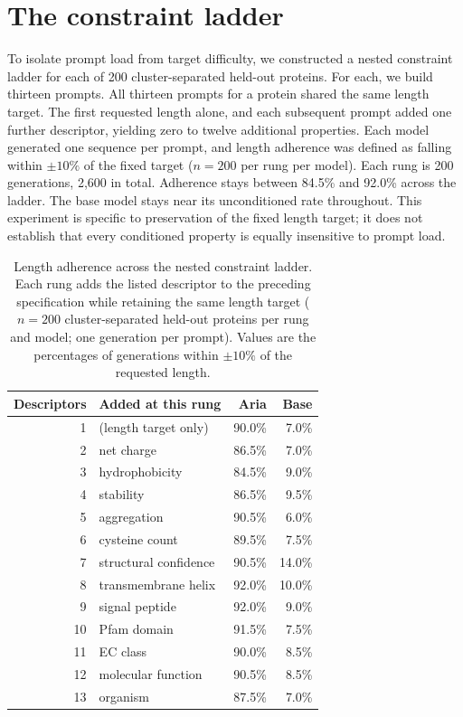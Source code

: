 \documentclass{article} %
\newcommand{\pct}{\%}
\begin{document}
\section{The constraint ladder}\label{app:ladder}
To isolate prompt load from target difficulty, we constructed a nested constraint ladder for each of 200 cluster-separated held-out proteins. For each, we build thirteen prompts. All thirteen prompts for a protein shared the same length target. The first requested length alone, and each subsequent prompt added one further descriptor, yielding zero to twelve additional properties. Each model generated one sequence per prompt, and length adherence was defined as falling within $\pm10\pct{}$ of the fixed target ($n=200$ per rung per model). Each
rung is 200 generations, 2{,}600 in total. Adherence stays between 84.5\pct{}
and 92.0\pct{} across the ladder. The base model stays
near its unconditioned rate throughout. This experiment is specific to preservation of the fixed length target; it does not establish that every conditioned property is equally insensitive to prompt load.
\begin{table}[h]
\caption{Length adherence across the nested constraint ladder. Each rung adds
the listed descriptor to the preceding specification while retaining the same
length target ($n=200$ cluster-separated held-out proteins per rung and model;
one generation per prompt). Values are the percentages of generations within
$\pm10\pct{}$ of the requested length.}
\label{tab:ladder}
\centering
\small
\begin{tabular}{rlrr}
\toprule
Descriptors & Added at this rung & Aria & Base \\
\midrule
1  & (length target only)  & 90.0\pct & 7.0\pct \\
2  & net charge            & 86.5\pct & 7.0\pct \\
3  & hydrophobicity        & 84.5\pct & 9.0\pct \\
4  & stability             & 86.5\pct & 9.5\pct \\
5  & aggregation           & 90.5\pct & 6.0\pct \\
6  & cysteine count        & 89.5\pct & 7.5\pct \\
7  & structural confidence & 90.5\pct & 14.0\pct \\
8  & transmembrane helix   & 92.0\pct & 10.0\pct \\
9  & signal peptide        & 92.0\pct & 9.0\pct \\
10 & Pfam domain           & 91.5\pct & 7.5\pct \\
11 & EC class              & 90.0\pct & 8.5\pct \\
12 & molecular function    & 90.5\pct & 8.5\pct \\
13 & organism              & 87.5\pct & 7.0\pct \\
\bottomrule
\end{tabular}
\end{table}
\end{document}
